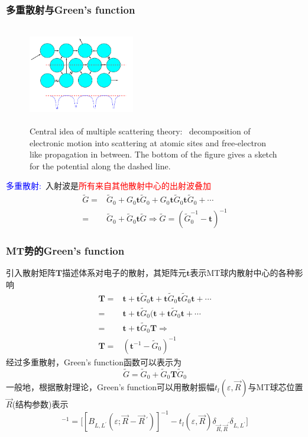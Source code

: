 \documentclass[cjk,slidestop,compress,mathserif,blue]{beamer}
\begin{document}
\frame
{
	\frametitle{多重散射与\textrm{Green's function}}
\begin{figure}[h!]
	\vspace{-40pt}
\centering
\includegraphics[height=1.70in,width=1.82in,viewport=5 0 515 495,clip]{Figures/multiple-scattering_theory.png}
\caption{\small \textrm{Central idea of multiple scattering theory:~ decomposition of electronic motion into scattering at atomic sites and free-electron like propagation in between. The bottom of the figure gives a sketch for the potential along the dashed line.}}
\label{Multi-scattering}
\end{figure}
\textcolor{blue}{多重散射:~}入射波是\textcolor{red}{所有来自其他散射中心的出射波叠加}
			\begin{displaymath}
				\begin{aligned}
					\tilde G=&\tilde G_0+G_0\mathbf{t}\tilde G_0+G_0\mathbf{t}\tilde G_0\mathbf{t}\tilde G_0+\cdots\\
					=&\tilde G_0+\tilde G_0\mathbf{t}\tilde G \Longrightarrow \tilde G=(\tilde G_0^{-1}-\mathbf{t})^{-1}
				\end{aligned}
			\end{displaymath}
}

\frame
{
	\frametitle{\textrm{MT}势的\textrm{Green's function}}
	引入散射矩阵$\mathbf{T}$描述体系对电子的散射，其矩阵元$\mathbf{t}$表示\textrm{MT}球内散射中心的各种影响\\
			\begin{displaymath}
				\begin{aligned}
					\mathbf{T}=&\mathbf{t}+\mathbf{t}\tilde G_0\mathbf{t}+\mathbf{t}\tilde G_0\mathbf{t}\tilde G_0\mathbf{t}+\cdots\\
					=&\mathbf{t}+\mathbf{t}\tilde G_0(\mathbf{t}+\mathbf{t}\tilde G_0\mathbf{t}+\cdots \\ 
					=&\mathbf{t}+\mathbf{t}\tilde G_0\mathbf{T}\Longrightarrow\\
					\mathbf{T}=&(\mathbf{t}^{-1}-\tilde G_0)^{-1}
				\end{aligned}
			\end{displaymath}
			经过多重散射，\textrm{Green's function}函数可以表示为$$\tilde G=\tilde G_0+\tilde G_0\mathbf{T}\tilde G_0$$
			一般地，根据散射理论，\textrm{Green's function}可以用散射振幅$t_l(\varepsilon, \vec R)$与\textrm{MT}球芯位置$\vec R$(结构参数)表示
\begin{displaymath}
	[G_{LL^{\prime}}(\varepsilon;\vec R,\vec R\,^{\prime})]^{-1}=\big[[B_{L,L^{\prime}}(\varepsilon;\vec R-\vec R\,^{\prime})]^{-1}-t_l(\varepsilon,\vec R)\delta_{\vec R,\vec R^{\prime}}\delta_{L,L^{\prime}}\big]
\end{displaymath}
}
\end{document}
